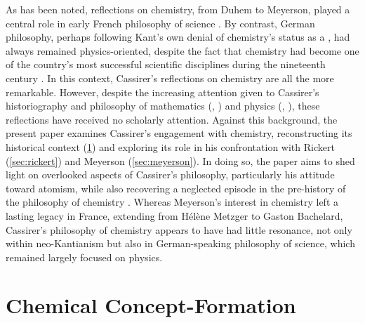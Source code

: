 \documentclass[submitted,12pt]{article}
\begin{document}
As has been noted, reflections on chemistry, from Duhem to Meyerson, played a central role in early French philosophy of science \citep{Bensaude-Vincent2009a}. By contrast, German philosophy, perhaps following Kant's own denial of chemistry's status as a , had always remained physics-oriented, despite the fact that chemistry had become one of the country's most successful scientific disciplines during the nineteenth century \citep{Rocke2021}. In this context, Cassirer's reflections on chemistry are all the more remarkable. However, despite the increasing attention given to Cassirer's historiography and philosophy of mathematics (\cite{Schiemer2018}, \cite{Reck2020}) and physics (\cite{Ryckman2005}, \cite{French2014}), these reflections have received no scholarly attention. Against this background, the present paper examines Cassirer's engagement with chemistry, reconstructing its historical context (\cref{sec:chemistry}) and exploring its role in his confrontation with Rickert (\cref{sec:rickert}) and Meyerson (\cref{sec:meyerson}). In doing so, the paper aims to shed light on overlooked aspects of Cassirer’s philosophy, particularly his attitude toward atomism, while also recovering a neglected episode in the pre-history of the philosophy of chemistry \citep{VanBrakel2012}. Whereas Meyerson's interest in chemistry left a lasting legacy in France, extending from H{\'e}l{\`e}ne Metzger to Gaston Bachelard, Cassirer's philosophy of chemistry appears to have had little resonance, not only within neo-Kantianism but also in German-speaking philosophy of science, which remained largely focused on physics.

\section{Chemical Concept-Formation}
\label{sec:chemistry}
\end{document}
